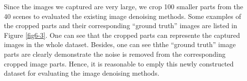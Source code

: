 Since the images we captured are very large, we crop 100 smaller parts from the 40 scenes to evaluated the existing image denoising methods. Some examples of the cropped parts and their corresponding ``ground truth'' images are listed in Figure \ref{fig6-3}. One can see that the cropped parts can represente the captured images in the whole dataset. Besides, one can see ththe ``ground truth'' image parts are clearly demonstrate the noise is removed from the corresponding cropped image parts. Hence, it is reasonable to emply this newly constructed dataset for evaluating the image denoising methods. 

\begin{figure}
    \centering
{}
\end{figure}
